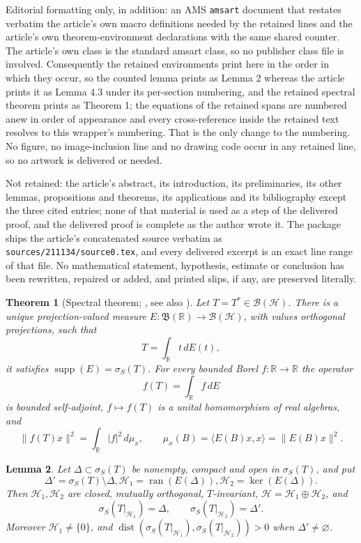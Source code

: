 \documentclass[10pt,a4paper]{amsart}
\theoremstyle{plain}
\newtheorem{theorem}{Theorem}
\newtheorem{lemma}[theorem]{Lemma}
\theoremstyle{definition}
\theoremstyle{remark}
\newcommand{\RR}{\mathbb R}
\newcommand{\BB}{\mathcal B}
\newcommand{\Bor}{\mathfrak B}
\newcommand{\HS}{\mathcal H}
\newcommand{\sigS}{\sigma_S}
\DeclareMathOperator{\ran}{ran}
\DeclareMathOperator{\dist}{dist}
\DeclareMathOperator{\supp}{supp}
\begin{document}
Editorial formatting only, in addition: an AMS \texttt{amsart} document that restates verbatim the article's own macro definitions needed by the retained lines and the article's own theorem-environment declarations with the same shared counter. The article's own class is the standard amsart class, so no publisher class file is involved. Consequently the retained environments print here in the order in which they occur, so the counted lemma prints as Lemma 2 whereas the article prints it as Lemma 4.3 under its per-section numbering, and the retained spectral theorem prints as Theorem 1; the equations of the retained spans are numbered anew in order of appearance and every cross-reference inside the retained text resolves to this wrapper's numbering. That is the only change to the numbering. No figure, no image-inclusion line and no drawing code occur in any retained line, so no artwork is delivered or needed.

Not retained: the article's abstract, its introduction, its preliminaries, its other lemmas, propositions and theorems, its applications and its bibliography except the three cited entries; none of that material is used as a step of the delivered proof, and the delivered proof is complete as the author wrote it. The package ships the article's concatenated source verbatim as \texttt{sources/211134/source0.tex}, and every delivered excerpt is an exact line range of that file. No mathematical statement, hypothesis, estimate or conclusion has been rewritten, repaired or added, and printed slips, if any, are preserved literally.
\begin{theorem}[{Spectral theorem; \cite[Corollary~11.2.2(ii)]{ColomboGantnerKimsey2018},
see also \cite{GhiloniMorettiPerotti2013,AlpayColomboKimsey2016}}]
Let $T=T^*\in\BB(\HS)$. There is a unique projection-valued measure
$E:\Bor(\RR)\to\BB(\HS)$, with values orthogonal projections, such
that $$T=\int_\RR t\,dE(t),$$ it satisfies $\supp(E)=\sigS(T)$. For
every bounded Borel $f:\RR\to\RR$ the operator $$f(T)=\int_\RR f\,dE$$
is bounded self-adjoint, $f\mapsto f(T)$ is a unital homomorphism of
real algebras, and
\begin{equation}
 \|f(T)x\|^2=\int_\RR|f|^2\,d\mu_x,
 \qquad
 \mu_x(B)=\langle E(B)x,x\rangle=\|E(B)x\|^2 .
 \label{eq:scalar}
\end{equation}
\end{theorem}

\begin{lemma}
\label{lem:restriction}
Let $\Delta\subset\sigS(T)$ be nonempty, compact and open in
$\sigS(T)$, and put $$\Delta'=\sigS(T)\setminus\Delta,
\HS_1=\ran(E(\Delta)), \HS_2=\ker(E(\Delta)).$$ Then $\HS_1,\HS_2$
are closed, mutually orthogonal, $T$-invariant,
$\HS=\HS_1\oplus\HS_2$, and
\[
 \sigS(T|_{\HS_1})=\Delta,\qquad \sigS(T|_{\HS_2})=\Delta' .
\]
Moreover $\HS_1\neq\{0\}$, and
$\dist(\sigS(T|_{\HS_1}),\sigS(T|_{\HS_2}))>0$ when
$\Delta'\neq\varnothing$.
\end{lemma}
\end{document}
